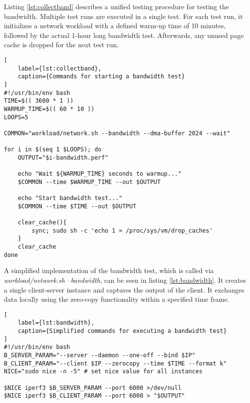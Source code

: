 Listing \ref{lst:collectband} describes a unified testing procedure for testing the bandwidth. Multiple test runs are executed in a single test. For each test run, it initializes a network workload with a defined warm-up time of 10 minutes, followed by the actual 1-hour long bandwidth test. Afterwards, any unused page cache is dropped for the next test run.

\vspace{.5\baselineskip}
\begin{lstlisting}[
    label={lst:collectband},
    caption={Commands for starting a bandwidth test}
]
#!/usr/bin/env bash
TIME=$(( 3600 * 1 ))
WARMUP_TIME=$(( 60 * 10 ))
LOOPS=5

COMMON="workload/network.sh --bandwidth --dma-buffer 2024 --wait"

for i in $(seq 1 $LOOPS); do
    OUTPUT="$i-bandwidth.perf"
    
    echo "Wait ${WARMUP_TIME} seconds to warmup..."
    $COMMON --time $WARMUP_TIME --out $OUTPUT
    
    echo "Start bandwidth test..."
    $COMMON --time $TIME --out $OUTPUT
    
    clear_cache(){
        sync; sudo sh -c 'echo 1 > /proc/sys/vm/drop_caches'
    }
    clear_cache
done
\end{lstlisting}

\vspace{-\baselineskip}

A simplified implementation of the bandwidth test, which is called via \textit{workload/network.sh --bandwidth}, can be seen in listing \ref{lst:bandwidth}. It creates a single client-server instance and captures the output of the client. It exchanges data locally using the zero-copy functionality within a specified time frame.

\enlargethispage{2\baselineskip}
\vspace{.5\baselineskip}
\begin{lstlisting}[
    label={lst:bandwidth},
    caption={Simplified commands for executing a bandwidth test}
]
#!/usr/bin/env bash
B_SERVER_PARAM="--server --daemon --one-off --bind $IP"
B_CLIENT_PARAM="--client $IP --zerocopy --time $TIME --format k"
NICE="sudo nice -n -5" # set nice value for all instances

$NICE iperf3 $B_SERVER_PARAM --port 6000 >/dev/null
$NICE iperf3 $B_CLIENT_PARAM --port 6000 > "$OUTPUT"
\end{lstlisting}